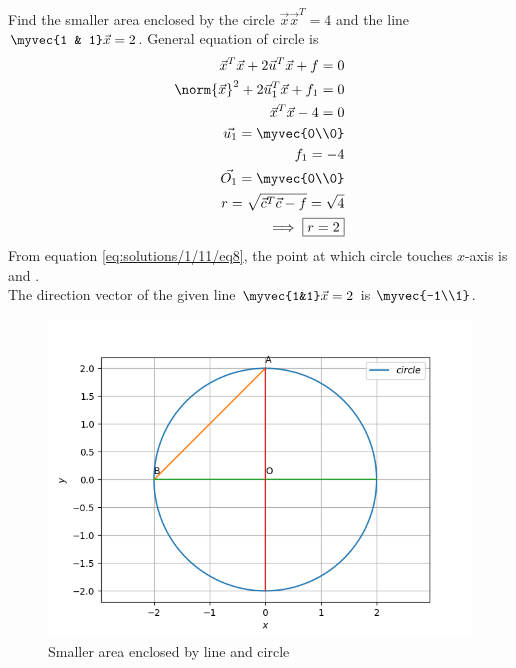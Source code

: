
Find the smaller area enclosed by the circle  $\vec{x}\vec{x}^T=4$ and the line $\myvec{1 & 1} \vec{x}=2$.
General equation of circle is 
\begin{align}
{\vec{x}^T\vec{x}} + 2\vec{u}^T\vec{x} + f = 0 \label{eq:solutions/1/11/eq1}\\
 \norm{\vec{x}}^2 + 2\vec{u}_1^T\vec{x} + f_1 = 0\label{eq:solutions/1/11/eq2}\\
 {\vec{x}^{T}\vec{x}}-4=0 \label{eq:solutions/1/11/eq3}\\
 \vec{u_1}=\myvec{0\\0}\label{eq:solutions/1/11/eq4}\\
 f_1=-4\label{eq:solutions/1/11/eq5}\\
\vec{O_1}=\myvec{0\\0}\label{eq:solutions/1/11/eq6}\\
r=\sqrt{\vec{c}^{T}\vec{c}-f} = \sqrt{4}\label{eq:solutions/1/11/eq7}\\
    \implies \boxed{r=2} \label{eq:solutions/1/11/eq8}
 \end{align}
From equation \eqref{eq:solutions/1/11/eq8}, the point at which circle touches $x$-axis is  and .\\
The direction vector of the given line $\myvec{1&1}\vec{x}=2$ is $\myvec{-1\\1}$.\\

\begin{figure}[!ht]
	\centering
	\includegraphics[width=\columnwidth]{./solutions/1/11/circle.png}
	\caption{Smaller area enclosed by line and circle}
	\label{eq:solutions/1/11/eq:myfig}
\end{figure}


